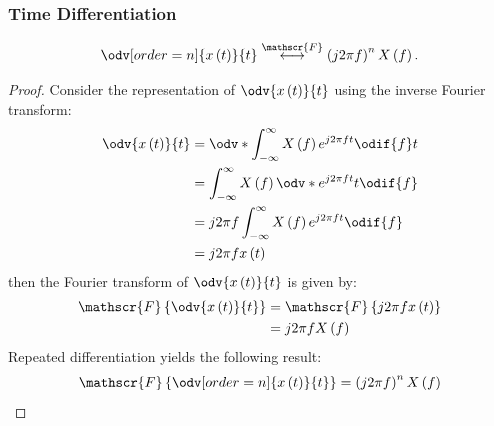 \documentclass{article}
\begin{document}
\subsubsection{Time Differentiation}
\begin{equation*}
    \odv[order=n]{x\left( t \right)}{t} \overset{\mathscr{F}}{\longleftrightarrow} \left( j 2\pi f \right)^n X\left( f \right).
\end{equation*}
\begin{proof}
    Consider the representation of \(\odv{x\left( t \right)}{t}\) using the inverse Fourier transform:
    \begin{align*}
        \odv{x\left( t \right)}{t} & = \odv*{\int_{-\infty}^\infty X\left( f \right) e^{j 2\pi f t}\odif{f}}{t} \\
                                   & = \int_{-\infty}^\infty X\left( f \right) \odv*{e^{j 2\pi f t}}{t}\odif{f} \\
                                   & = j 2\pi f \int_{-\infty}^\infty X\left( f \right) e^{j 2\pi f t}\odif{f}  \\
                                   & = j 2\pi f x\left( t \right)
    \end{align*}
    then the Fourier transform of \(\odv{x\left( t \right)}{t}\) is given by:
    \begin{align*}
        \mathscr{F}\left\{ \odv{x\left( t \right)}{t} \right\} & = \mathscr{F}\left\{ j 2\pi f x\left( t \right) \right\} \\
                                                               & = j 2\pi f X\left( f \right)
    \end{align*}
    Repeated differentiation yields the following result:
    \begin{equation*}
        \mathscr{F}\left\{ \odv[order=n]{x\left( t \right)}{t} \right\} = \left( j 2\pi f \right)^n X\left( f \right)
    \end{equation*}
\end{proof}
\end{document}
